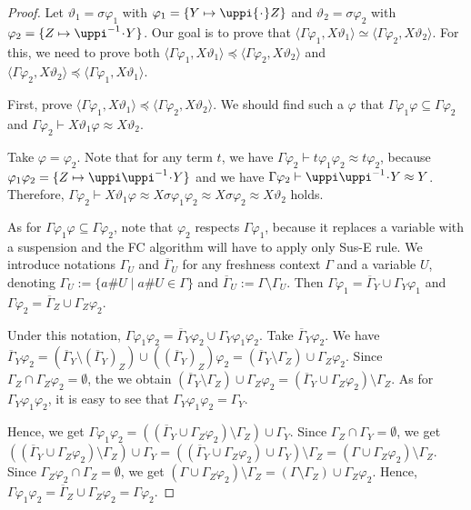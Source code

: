 \documentclass[11pt,a4paper]{amsart}
\theoremstyle{definition}
\newcommand{\permap}{{\mkern 1mu\cdot \mkern 1mu}}
\newcommand\ppi{\uppi}
\newcommand{\np}[2]{\langle #1, \allowbreak #2\rangle}
\newcommand{\fe}{{\sf FC}}
\begin{document}
\begin{proof}
Let $\vartheta_1 = \sigma\varphi_1$ with $\varphi_1=\{Y \mapsto \ppi \permap Z\}$ and $\vartheta_2=\sigma\varphi_2$ with $\varphi_2=\{Z \mapsto \ppi^{-1}\permap Y \}$. Our goal is to prove that $\np{\Gamma\varphi_1}{X\vartheta_1} \simeq \np{\Gamma\varphi_2}{X\vartheta_2}$. For this, we need to prove both $\np{\Gamma\varphi_1}{X\vartheta_1} \preceq \np{\Gamma\varphi_2}{X\vartheta_2}$ and $\np{\Gamma\varphi_2}{X\vartheta_2} \preceq \np{\Gamma\varphi_1}{X\vartheta_1}$.

First, prove $\np{\Gamma\varphi_1}{X\vartheta_1} \preceq \np{\Gamma\varphi_2}{X\vartheta_2}$. We should find such a $\varphi$ that $\Gamma\varphi_1\varphi \subseteq \Gamma\varphi_2$ and $\Gamma\varphi_2 \vdash X\vartheta_1\varphi \approx X\vartheta_2$. 

Take $\varphi=\varphi_2$. Note that for any term $t$, we have $\Gamma\varphi_2 \vdash t \varphi_1\varphi_2 \approx t\varphi_2$, because $\varphi_1\varphi_2 =\{Z \mapsto \ppi \ppi^{-1}\permap Y\}$ and we have $\Gamma\varphi_2 \vdash \ppi \ppi^{-1}\permap Y \approx Y$.
 Therefore, $\Gamma\varphi_2 \vdash X\vartheta_1\varphi \approx X\sigma\varphi_1\varphi_2 \approx X\sigma\varphi_2 \approx X\vartheta_2$ holds.


As for $\Gamma\varphi_1\varphi \subseteq \Gamma\varphi_2$, note that $\varphi_2$ respects $\Gamma\varphi_1$, because it replaces a variable with a suspension and the {\fe} algorithm will have to apply only {\sf Sus-E} rule. We introduce notations $\Gamma_U$ and $\overline{\Gamma}_U$ for any freshness context $\Gamma$ and a variable $U$, denoting $ \Gamma_U:= \{a\# U \mid a\# U \in \Gamma\}$ and $\overline{\Gamma}_U := \Gamma \setminus \Gamma_U $. Then $\Gamma\varphi_1= \overline{\Gamma}_Y \cup \Gamma_Y\varphi_1$ and $\Gamma\varphi_2= \overline{\Gamma}_Z \cup \Gamma_Z\varphi_2$.

Under this notation, $\Gamma\varphi_1\varphi_2=\overline{\Gamma}_Y\varphi_2 \cup \Gamma_Y\varphi_1\varphi_2$. Take $\overline{\Gamma}_Y\varphi_2$. We have $\overline{\Gamma}_Y\varphi_2 =
(\overline{\Gamma}_Y \setminus (\overline{\Gamma}_Y)_Z) \cup ((\overline{\Gamma}_Y)_Z)\varphi_2 = (\overline{\Gamma}_Y \setminus \Gamma_Z) \cup \Gamma_Z\varphi_2$. Since $\Gamma_Z\cap \Gamma_Z\varphi_2=\emptyset$, the we obtain $(\overline{\Gamma}_Y \setminus \Gamma_Z) \cup \Gamma_Z\varphi_2=(\overline{\Gamma}_Y \cup \Gamma_Z\varphi_2) \setminus \Gamma_Z$. As for $\Gamma_Y\varphi_1\varphi_2$, it is easy to see that $\Gamma_Y\varphi_1\varphi_2=\Gamma_Y$.

Hence, we get $\Gamma\varphi_1\varphi_2= ((\overline{\Gamma}_Y \cup \Gamma_Z\varphi_2) \setminus \Gamma_Z) \cup \Gamma_Y$. Since $\Gamma_Z\cap \Gamma_Y=\emptyset$, we get
$((\overline{\Gamma}_Y \cup \Gamma_Z\varphi_2) \setminus \Gamma_Z) \cup \Gamma_Y=((\overline{\Gamma}_Y \cup \Gamma_Z\varphi_2) \cup \Gamma_Y) \setminus \Gamma_Z = (\Gamma \cup \Gamma_Z\varphi_2) \setminus \Gamma_Z$. Since $\Gamma_Z\varphi_2\cap \Gamma_Z=\emptyset$, we get $(\Gamma \cup \Gamma_Z\varphi_2) \setminus \Gamma_Z=(\Gamma \setminus \Gamma_Z) \cup \Gamma_Z\varphi_2$. Hence, $\Gamma\varphi_1\varphi_2= \overline{\Gamma}_Z \cup \Gamma_Z\varphi_2 = \Gamma\varphi_2$. 


\end{proof}
\end{document}

